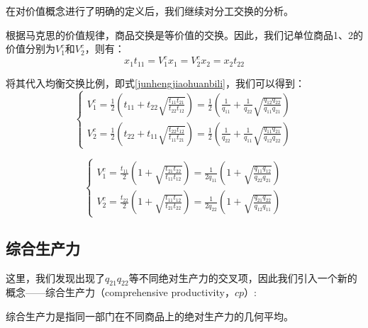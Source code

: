 在对价值概念进行了明确的定义后，我们继续对分工交换的分析。

根据马克思的价值规律，商品交换是等价值的交换。因此，我们记单位商品1、2的价值分别为$V^c_1$和$V^c_2$，则有\cite[70]{CaiJiMingCongXiaYiJieZhiLunDaoGuangYiJieZhiLunXiuDingBan2022}：
\begin{equation}
    \label{dengjiajiaohuan}
    x_1 t_{11} = V^c_1 x_1 = V^c_2 x_2 = x_2 t_{22}
\end{equation}

将其代入均衡交换比例，即式\ref{junhengjiaohuanbili}，我们可以得到\cite[70-71]{CaiJiMingCongXiaYiJieZhiLunDaoGuangYiJieZhiLunXiuDingBan2022}：
\begin{equation}
    \begin{cases}
        V^c_1 = \frac{1}{2}\left(t_{11}+t_{22}\sqrt{\frac{t_{11} t_{21}}{t_{22} t_{12}}}\right)=\frac{1}{2}\left(\frac{1}{q_{11}}+\frac{1}{q_{22}}\sqrt{\frac{q_{12}q_{22}}{q_{11}q_{21}}}\right) \\
        V^c_2 =\frac{1}{2}\left(t_{22}+t_{11}\sqrt{\frac{t_{22} t_{12}}{t_{11} t_{21}}}\right) = \frac{1}{2}\left( \frac{1}{q_{22}}+\frac{1}{q_{11}}\sqrt{\frac{q_{11}q_{21}}{q_{12}q_{22}}}\right)
    \end{cases}
\end{equation}

\begin{equation}
    \label{danweishangpingdejiazhi}
    \begin{cases}
        V^c_1 = \frac{t_{11}}{2}\left(1+\sqrt{\frac{t_{21}t_{22}}{t_{11}t_{12}}}\right)=\frac{1}{2q_{11}}\left(1+\sqrt{\frac{q_{11}q_{12}}{q_{22}q_{21}}}\right) \\

        V^c_2 = \frac{t_{22}}{2}\left(1+\sqrt{\frac{t_{11}t_{12}}{t_{21}t_{22}}}\right)=\frac{1}{2q_{22}}\left(1+\sqrt{\frac{q_{21}q_{22}}{q_{12}q_{11}}}\right)
    \end{cases}
\end{equation}

\subsection{综合生产力}

这里，我们发现出现了$q_{21}q_{22}$等不同绝对生产力的交叉项，因此我们引入一个新的概念——综合生产力（comprehensive productivity，$cp$）:
\begin{definition}
    综合生产力是指同一部门在不同商品上的绝对生产力的几何平均\cite[81]{CaiJiMingCongXiaYiJieZhiLunDaoGuangYiJieZhiLunXiuDingBan2022}。
\end{definition}

